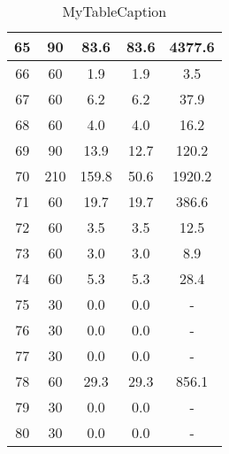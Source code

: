 \documentclass[a4paper,10pt]{article}
\begin{document}
\begin{table}
\begin{tabular}{|c|c|c|c|c|}
\hline
65 & 90 & 83.6 & 83.6 & 4377.6 \\
\hline
66 & 60 & 1.9 & 1.9 & 3.5 \\
\hline
67 & 60 & 6.2 & 6.2 & 37.9 \\
\hline
68 & 60 & 4.0 & 4.0 & 16.2 \\
\hline
69 & 90 & 13.9 & 12.7 & 120.2 \\
\hline
70 & 210 & 159.8 & 50.6 & 1920.2 \\
\hline
71 & 60 & 19.7 & 19.7 & 386.6 \\
\hline
72 & 60 & 3.5 & 3.5 & 12.5 \\
\hline
73 & 60 & 3.0 & 3.0 & 8.9 \\
\hline
74 & 60 & 5.3 & 5.3 & 28.4 \\
\hline
75 & 30 & 0.0 & 0.0 & - \\
\hline
76 & 30 & 0.0 & 0.0 & - \\
\hline
77 & 30 & 0.0 & 0.0 & - \\
\hline
78 & 60 & 29.3 & 29.3 & 856.1 \\
\hline
79 & 30 & 0.0 & 0.0 & - \\
\hline
80 & 30 & 0.0 & 0.0 & - \\
\hline
\end{tabular}
\caption{MyTableCaption}
\label{table:MyTableLabel}
\end{table}
\end{document}
